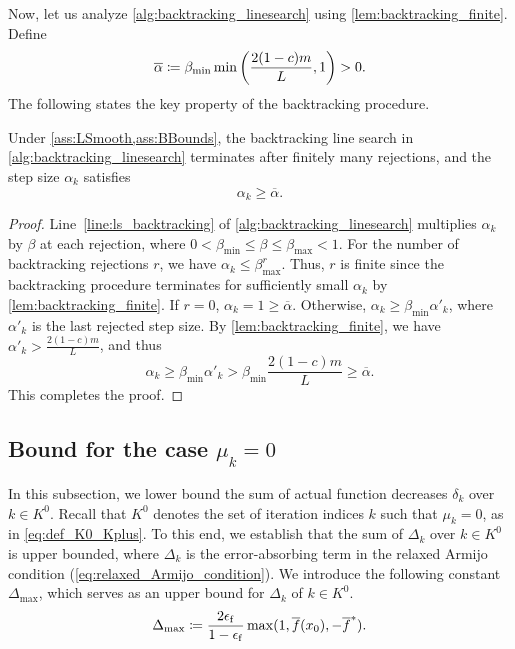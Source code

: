 \documentclass[journal_revised_MPC]{subfiles}
\begin{document}
Now, let us analyze \cref{alg:backtracking_linesearch} using \cref{lem:backtracking_finite}.
Define
\begin{equation}\label{eq:def_alpha_bar}
    \overline{\alpha}\coloneqq \beta_{\min}\min\qty(\frac{2(1-c)m}{L},1)>0.
\end{equation}
The following states the key property of the backtracking procedure.

\begin{proposition}\label{prop:backtracking_summary}
    Under \cref{ass:LSmooth,ass:BBounds}, the backtracking line search in \cref{alg:backtracking_linesearch} terminates after finitely many rejections, and the step size $\alpha_k$ satisfies
    \begin{equation*}
        \alpha_k\ge\overline{\alpha}.
    \end{equation*}
\end{proposition}
\begin{proof}
    Line~\ref{line:ls_backtracking} of \cref{alg:backtracking_linesearch} multiplies $\alpha_k$ by $\beta$ at each rejection, where $0<\beta_{\min} \leq \beta \leq \beta_{\max}<1$.
    For the number of backtracking rejections $r$, we have $\alpha_k\le\beta_{\max}^r$.
    Thus, $r$ is finite since the backtracking procedure terminates for sufficiently small $\alpha_k$ by \cref{lem:backtracking_finite}.
    If $r=0$, $\alpha_k=1\ge\overline{\alpha}$.
    Otherwise, $\alpha_k \geq \beta_{\min} \alpha'_k$, where $\alpha'_k$ is the last rejected step size.
    By \cref{lem:backtracking_finite}, we have $\alpha'_k > \frac{2(1-c)m}{L}$, and thus
    \begin{equation*}
        \alpha_k \ge \beta_{\min}\alpha'_k > \beta_{\min} \frac{2(1-c)m}{L} \geq \overline{\alpha}.
    \end{equation*}
    This completes the proof.
    \myQED
\end{proof}

\subsection{Bound for the case \texorpdfstring{$\mu_k=0$}{mu k = 0}}
\label{sec:unregularized_bound}

In this subsection, we lower bound the sum of actual function decreases $\delta_k$ over $k \in K^0$.
Recall that $K^0$ denotes the set of iteration indices $k$ such that $\mu_k = 0$, as in \cref{eq:def_K0_Kplus}.
To this end, we establish that the sum of $\Delta_k$ over $k \in K^0$ is upper bounded, where $\Delta_k$ is the error-absorbing term in the relaxed Armijo condition (\cref{eq:relaxed_Armijo_condition}).
We introduce the following constant $\Delta_{\max}$, which serves as an upper bound for $\Delta_k$ of $k \in K^0$.
\begin{equation}\label{eq:def_Delta_max}
    \Delta_{\max} \coloneqq \frac{2\epsilon_\mathrm{f}}{1-\epsilon_\mathrm{f}} \max(1, \overline{f}(x_{0}), -\overline{f}^*).
\end{equation}
\end{document}
